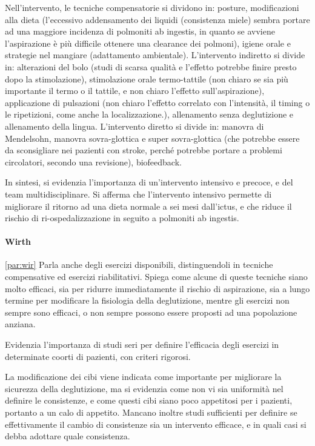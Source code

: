 Nell'intervento, le tecniche compensatorie si dividono in: posture, 
modificazioni alla dieta (l'eccessivo addensamento dei liquidi (consistenza 
miele) sembra portare ad una maggiore incidenza di polmoniti ab ingestis, in 
quanto se avviene l'aspirazione è più difficile ottenere una clearance dei 
polmoni), igiene orale e strategie nel mangiare (adattamento 
ambientale).
L'intervento indiretto si divide in: alterazioni del bolo (studi di scarsa 
qualità e l'effetto potrebbe finire presto dopo la stimolazione), stimolazione 
orale termo-tattile (non chiaro se sia più importante il termo o il tattile, e 
non chiaro l'effetto sull'aspirazione), applicazione di pulsazioni (non chiaro 
l'effetto correlato con l'intensità, il timing o le ripetizioni, come anche la 
localizzazione.), allenamento senza deglutizione e allenamento della lingua.
L'intervento diretto si divide in: manovra di Mendelsohn, manovra 
sovra-glottica e super sovra-glottica (che potrebbe essere da sconsigliare nei 
pazienti con stroke, perché potrebbe portare a problemi circolatori, secondo 
una revisione), biofeedback.

In sintesi, si evidenzia l'importanza di un'intervento intensivo e precoce, e 
del team multidisciplinare.
Si afferma che l'intervento intensivo permette di migliorare il ritorno ad una 
dieta normale a sei mesi dall'ictus, e che riduce il rischio di 
ri-ospedalizzazione in seguito a polmoniti ab ingestis.

\paragraph{Wirth}\ref{par:wir} Parla anche degli esercizi disponibili, 
distinguendoli in tecniche compensative ed esercizi riabilitativi.
Spiega come alcune di queste tecniche siano molto efficaci, sia per ridurre 
immediatamente il rischio di aspirazione, sia a lungo termine per modificare la 
fisiologia della deglutizione, mentre gli esercizi non sempre sono efficaci, o 
non sempre possono essere proposti ad una popolazione anziana.

Evidenzia l'importanza di studi seri per definire l'efficacia degli esercizi in 
determinate coorti di pazienti, con criteri rigorosi.

La modificazione dei cibi viene indicata come importante per migliorare la 
sicurezza della deglutizione, ma si evidenzia come non vi sia uniformità nel 
definire le consistenze, e come questi cibi siano poco appetitosi per i 
pazienti, portanto a un calo di appetito.
Mancano inoltre studi sufficienti per definire se effettivamente il cambio di 
consistenze sia un intervento efficace, e in quali casi si debba adottare quale 
consistenza.

